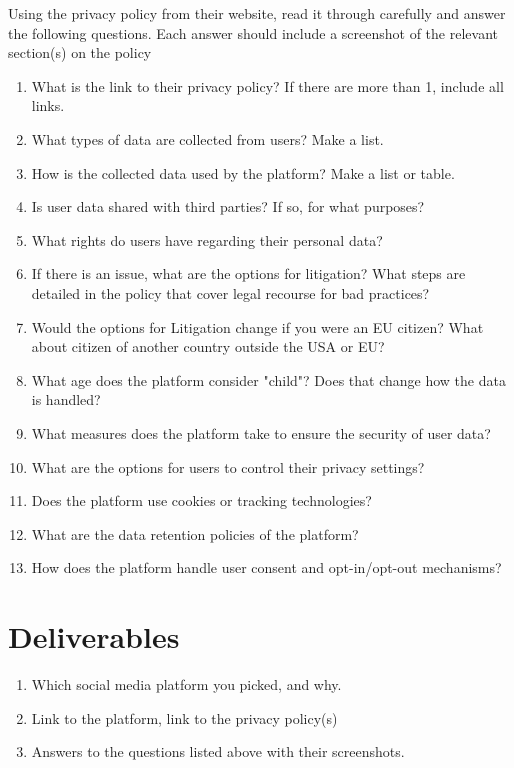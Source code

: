 \documentclass[12pt]{article}
\begin{document}
        

Using the privacy policy from their website, read it through carefully and answer the following questions.  Each answer should include a screenshot of the relevant section(s) on the policy
            \begin{enumerate}
                \item What is the link to their privacy policy? If there are more than 1, include all links.
                \item What types of data are collected from users?  Make a list.
                \item How is the collected data used by the platform?  Make a list or table.
                \item Is user data shared with third parties? If so, for what purposes?
                \item What rights do users have regarding their personal data?
                \item If there is an issue, what are the options for litigation? What steps are detailed in the policy that cover legal recourse for bad practices?
                \item Would the options for Litigation change if you were an EU citizen? What about citizen of another country outside the USA or EU?
                \item What age does the platform consider "child"? Does that change how the data is handled?
                \item What measures does the platform take to ensure the security of user data?
                \item What are the options for users to control their privacy settings?
                \item Does the platform use cookies or tracking technologies?
                \item What are the data retention policies of the platform?
                \item How does the platform handle user consent and opt-in/opt-out mechanisms?
        \end{enumerate}


\section*{Deliverables}

\begin{enumerate}
    \item Which social media platform you picked, and why.
    \item Link to the platform, link to the privacy policy(s)
    \item Answers to the questions listed above with their screenshots.

\end{enumerate}
\end{document}
